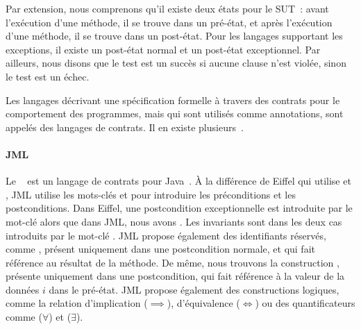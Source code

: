 Par extension, nous comprenons qu'il existe deux états pour le SUT~: avant
l'exécution d'une méthode, il se trouve dans un {\strong pré-état}, et après
l'exécution d'une méthode, il se trouve dans un {\strong post-état}. Pour les
langages supportant les exceptions, il existe un post-état normal et un
post-état exceptionnel. Par ailleurs, nous disons que le test est un {\strong
succès} si aucune clause n'est violée, sinon le test est un {\strong échec}.

Les langages décrivant une spécification formelle à travers des contrats pour
le comportement des programmes, mais qui sont utilisés comme annotations, sont
appelés des {\strong langages de contrats}. Il en existe
plusieurs~.

\paragraph{JML} Le ~ est un langage
de contrats pour Java~. À la différence de Eiffel qui utilise
 et , JML utilise les mots-clés  et
 pour introduire les préconditions et les postconditions. Dans
Eiffel, une postcondition exceptionnelle est introduite par le mot-clé
 alors que dans JML, nous avons . Les invariants sont
dans les deux cas introduits par le mot-clé . JML propose
également des identifiants réservés, comme \aresult, présent uniquement dans une
postcondition normale, et qui fait référence au résultat de la méthode.  De
même, nous trouvons la construction , présente uniquement dans une
postcondition, qui fait référence à la valeur de la données $i$ dans le
pré-état. JML propose également des constructions logiques, comme la relation
d'implication ($\implies$), d'équivalence ($\Longleftrightarrow$) ou des
quantificateurs comme  ($\forall$) et
 ($\exists$).

